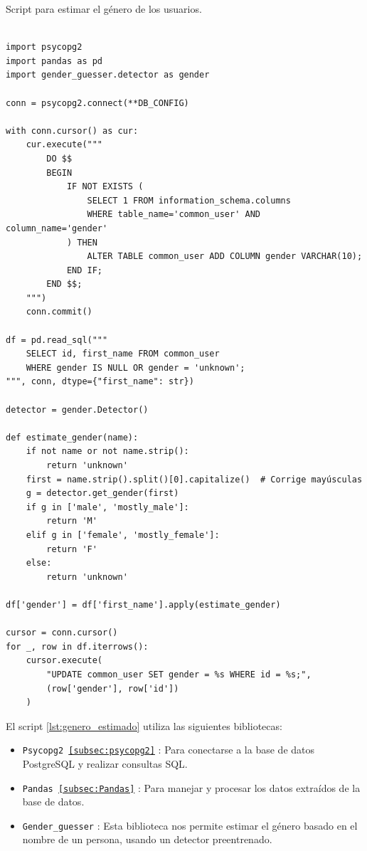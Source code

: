 \documentclass[a4paper, 12pt]{book}
\begin{document}
\begin{listing}[h!]
\caption{Script para estimar el género de los usuarios.}
\label{lst:genero_estimado}
\begin{verbatim}

import psycopg2
import pandas as pd
import gender_guesser.detector as gender

conn = psycopg2.connect(**DB_CONFIG)

with conn.cursor() as cur:
    cur.execute("""
        DO $$
        BEGIN
            IF NOT EXISTS (
                SELECT 1 FROM information_schema.columns 
                WHERE table_name='common_user' AND column_name='gender'
            ) THEN
                ALTER TABLE common_user ADD COLUMN gender VARCHAR(10);
            END IF;
        END $$;
    """)
    conn.commit()

df = pd.read_sql("""
    SELECT id, first_name FROM common_user 
    WHERE gender IS NULL OR gender = 'unknown';
""", conn, dtype={"first_name": str})

detector = gender.Detector()

def estimate_gender(name):
    if not name or not name.strip():
        return 'unknown'
    first = name.strip().split()[0].capitalize()  # Corrige mayúsculas
    g = detector.get_gender(first)
    if g in ['male', 'mostly_male']:
        return 'M'
    elif g in ['female', 'mostly_female']:
        return 'F'
    else:
        return 'unknown'

df['gender'] = df['first_name'].apply(estimate_gender)

cursor = conn.cursor()
for _, row in df.iterrows():
    cursor.execute(
        "UPDATE common_user SET gender = %s WHERE id = %s;",
        (row['gender'], row['id'])
    )

\end{verbatim}
\end{listing}

El script \ref{lst:genero_estimado} utiliza las siguientes bibliotecas:

\begin{itemize}
    \item \texttt{Psycopg2 \ref{subsec:psycopg2}} : Para conectarse a la base de datos PostgreSQL y realizar consultas SQL.
    \item \texttt{Pandas \ref{subsec:Pandas}} : Para manejar y procesar los datos extraídos de la base de datos.
    \item \texttt{Gender\_guesser\cite{genderGuesserDocumentation}} : Esta biblioteca nos permite estimar el género basado en el nombre de un persona, usando un detector preentrenado.
\end{itemize}
\end{document}

